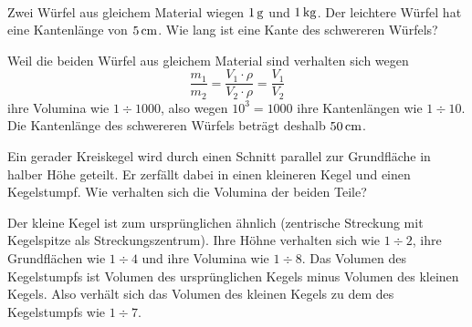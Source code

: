 \documentclass[%
11pt,%
twoside,%
titlepage,%
german,%
headsepline%
]{scrartcl}
\begin{document}
\begin{bsps}
\ \\[-2ex]
\begin{enumeratea}
\item Zwei W\"urfel aus gleichem Material wiegen $\unit[1]{g}$ und $\unit[1]{kg}$. Der leichtere W\"urfel hat eine Kantenl\"ange von $\unit[5]{cm}$. Wie lang ist eine Kante des schwereren W\"urfels?

Weil die beiden W\"urfel aus gleichem Material sind verhalten sich wegen
$$\frac{m_1}{m_2}=\frac{V_1\cdot\rho}{V_2\cdot\rho}=\frac{V_1}{V_2}$$
ihre Volumina wie $1\div1000$, also wegen $10^3=1000$ ihre Kantenl\"angen wie $1\div10$. Die Kantenl\"ange des schwereren W\"urfels betr\"agt deshalb $\unit[50]{cm}$.
\item Ein gerader Kreiskegel wird durch einen Schnitt parallel zur Grundfl\"ache in halber H\"ohe geteilt. Er zerf\"allt dabei in einen kleineren Kegel und einen Kegelstumpf. Wie verhalten sich die Volumina der beiden Teile?

Der kleine Kegel ist zum urspr\"unglichen \"ahnlich (zentrische Streckung mit Kegelspitze als Streckungszentrum). Ihre H\"ohne verhalten sich wie $1\div2$, ihre Grundfl\"achen wie $1\div4$ und ihre Volumina wie $1\div8$. Das Volumen des Kegelstumpfs ist Volumen des urspr\"unglichen Kegels minus Volumen des kleinen Kegels. Also verh\"alt sich das Volumen des kleinen Kegels zu dem des Kegelstumpfs wie $1\div7$.
\end{enumeratea}
\end{bsps}

\clearpage
\end{document}

